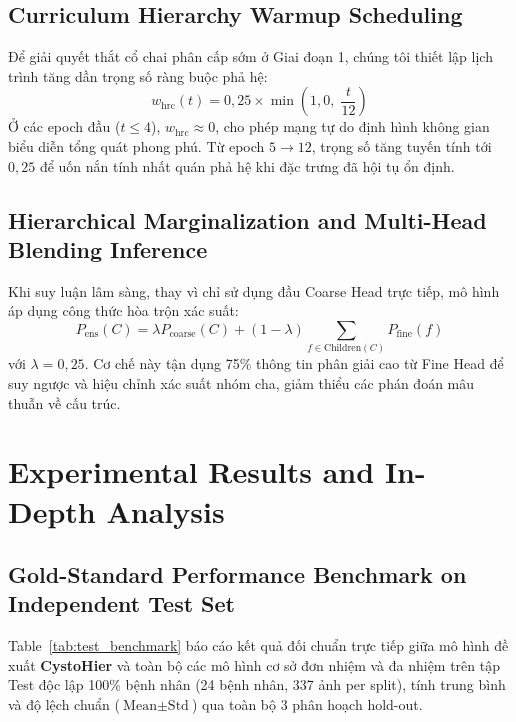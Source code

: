 \documentclass[runningheads]{llncs}
\begin{document}
\subsection{Curriculum Hierarchy Warmup Scheduling}
Để giải quyết thắt cổ chai phân cấp sớm ở Giai đoạn 1, chúng tôi thiết lập lịch trình tăng dần trọng số ràng buộc phả hệ:
\begin{equation}
w_{\text{hrc}}(t) = 0{,}25 \times \min\left(1{,}0, \; \frac{t}{12}\right)
\end{equation}
Ở các epoch đầu ($t \le 4$), $w_{\text{hrc}} \approx 0$, cho phép mạng tự do định hình không gian biểu diễn tổng quát phong phú. Từ epoch $5 \to 12$, trọng số tăng tuyến tính tới $0{,}25$ để uốn nắn tính nhất quán phả hệ khi đặc trưng đã hội tụ ổn định.

\subsection{Hierarchical Marginalization and Multi-Head Blending Inference}
Khi suy luận lâm sàng, thay vì chỉ sử dụng đầu Coarse Head trực tiếp, mô hình áp dụng công thức hòa trộn xác suất:
\begin{equation}
P_{\text{ens}}(C) = \lambda P_{\text{coarse}}(C) + (1-\lambda) \sum_{f \in \text{Children}(C)} P_{\text{fine}}(f)
\end{equation}
với $\lambda = 0{,}25$. Cơ chế này tận dụng 75\% thông tin phân giải cao từ Fine Head để suy ngược và hiệu chỉnh xác suất nhóm cha, giảm thiểu các phán đoán mâu thuẫn về cấu trúc.

\FloatBarrier
\section{Experimental Results and In-Depth Analysis}
\label{sec:experiments}

\subsection{Gold-Standard Performance Benchmark on Independent Test Set}
Table~\ref{tab:test_benchmark} báo cáo kết quả đối chuẩn trực tiếp giữa mô hình đề xuất \textbf{CystoHier} và toàn bộ các mô hình cơ sở đơn nhiệm và đa nhiệm trên tập Test độc lập 100\% bệnh nhân (24 bệnh nhân, 337 ảnh per split), tính trung bình và độ lệch chuẩn ($\text{Mean} \pm \text{Std}$) qua toàn bộ 3 phân hoạch hold-out.
\end{document}
